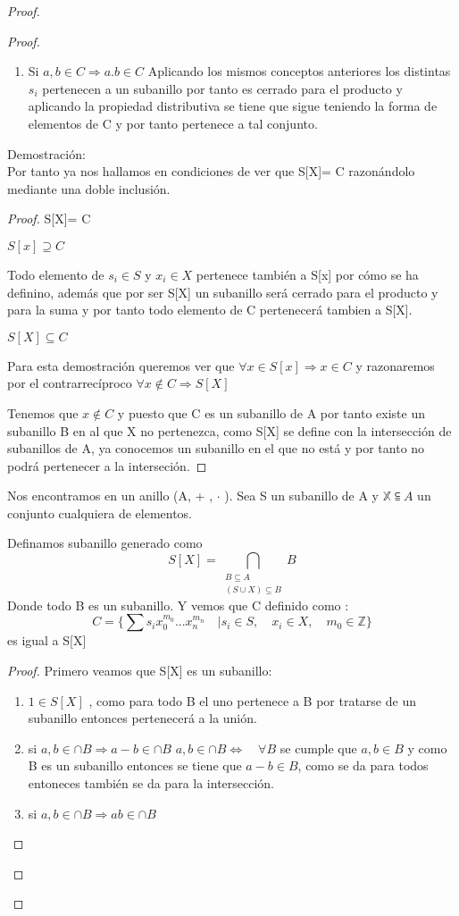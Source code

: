 \begin{proof}
\begin{proof}
\begin{enumerate}
 \item Si $a,b \in C \Rightarrow a.b \in C $
 Aplicando los mismos conceptos anteriores los distintas $s_i$ pertenecen a un subanillo por tanto es cerrado para el producto y aplicando la propiedad distributiva se tiene que sigue teniendo la forma de elementos de C y por tanto pertenece a tal conjunto.
\end{enumerate}
Demostración: \\
Por tanto ya nos hallamos en condiciones de ver que S[X]= C razonándolo mediante una doble inclusión.
\begin{proof}
S[X]= C


$ S[x] \supseteq C $

Todo elemento de $s_i \in S $ y $x_i \in X$ pertenece también a S[x] por cómo se ha definino, además que por ser S[X] un subanillo será cerrado para el producto y para la suma y
por tanto todo elemento de C pertenecerá tambien a S[X].

$ S[X] \subseteq C$

Para esta demostración queremos ver que $ \forall x \in S[x] \Rightarrow x  \in C$ y razonaremos por el contrarrecíproco $\forall x \notin C \Rightarrow S[X]$

Tenemos que $ x \notin C $ y puesto que C es un subanillo de A por tanto existe un subanillo B en al que X no pertenezca, como S[X] se define con la intersección de subanillos de A, ya conocemos un subanillo en el que no está y por tanto no podrá pertenecer a la interseción.

\end {proof}
Nos encontramos en un anillo (A, + , $\cdot$ ). Sea S un subanillo de A y $\mathds{X} \subseteqq A$ un conjunto cualquiera de elementos.

Definamos subanillo generado como
$$ S[X] = \bigcap_{ \substack{ B \subseteq  A \\ (S \cup X) \subseteq B}} B $$ Donde todo B es un subanillo.
Y vemos que C definido como :  $$ C = \{ \sum s_i x_{0}^{m_0} ...x_{n}^{m_n} \quad | s_i \in S, \quad x_i \in X,  \quad  m_0 \in \mathds{Z} \} $$ es igual a S[X]
\begin{proof}
Primero veamos que S[X] es un subanillo:
\begin{enumerate}
\item $ 1 \in S[X]$ , como para todo B el uno pertenece a B por tratarse de un subanillo entonces pertenecerá a la unión.
\item si $a,b \in \cap B \Rightarrow a-b \in \cap B$
$ a,b \in \cap B \Leftrightarrow \quad \forall B$ se cumple que $a,b \in B$ y como B es un subanillo entonces se tiene que $a-b \in B$, como se da para
todos entoneces también se da para la intersección.
\item si $a,b \in \cap B \Rightarrow ab \in \cap B$


\end{enumerate}
\end{proof}
\end{proof}
\end{proof}
